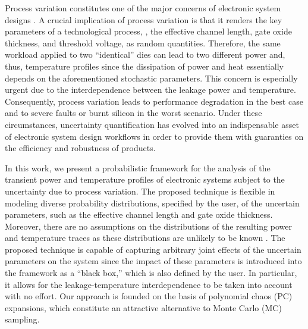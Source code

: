 Process variation constitutes one of the major concerns of electronic system
designs \cite{srivastava2010}. A crucial implication of process variation is
that it renders the key parameters of a technological process, \eg, the
effective channel length, gate oxide thickness, and threshold voltage, as random
quantities. Therefore, the same workload applied to two ``identical'' dies can
lead to two different power and, thus, temperature profiles since the
dissipation of power and heat essentially depends on the aforementioned
stochastic parameters. This concern is especially urgent due to the
interdependence between the leakage power and temperature. Consequently, process
variation leads to performance degradation in the best case and to severe faults
or burnt silicon in the worst scenario. Under these circumstances, uncertainty
quantification \cite{xiu2010} has evolved into an indispensable asset of
electronic system design workflows in order to provide them with guaranties on
the efficiency and robustness of products.

In this work, we present a probabilistic framework for the analysis of the
transient power and temperature profiles of electronic systems subject to the
uncertainty due to process variation. The proposed technique is flexible in
modeling diverse probability distributions, specified by the user, of the
uncertain parameters, such as the effective channel length and gate oxide
thickness. Moreover, there are no assumptions on the distributions of the
resulting power and temperature traces as these distributions are unlikely to be
known \apriori. The proposed technique is capable of capturing arbitrary joint
effects of the uncertain parameters on the system since the impact of these
parameters is introduced into the framework as a ``black box,'' which is also
defined by the user. In particular, it allows for the leakage-temperature
interdependence to be taken into account with no effort. Our approach is founded
on the basis of polynomial chaos (PC) expansions, which constitute an attractive
alternative to Monte Carlo (MC) sampling.
